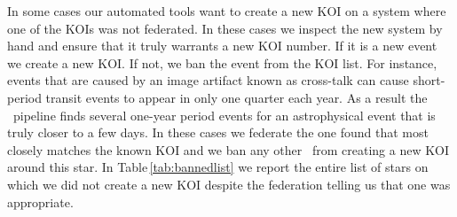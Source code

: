In some cases our automated tools want to create a new KOI on a system where one of the KOIs was not federated.  In these cases we inspect the new system by hand and ensure that it truly warrants a new KOI number. If it is a new event we create a new KOI. If not, we ban the event from the KOI list.  For instance, events that are caused by an image artifact known as cross-talk \citet{Coughlin2014a} can cause short-period transit events to appear in only one quarter each year. As a result the \Kepler\ pipeline finds several one-year period events for an astrophysical event that is truly closer to a few days.  In these cases we federate the one found that most closely matches the known KOI and we ban any other \opstce\ from creating a new KOI around this star. In Table\,\ref{tab:bannedlist} we report the entire list of stars on which we did not create a new KOI despite the federation telling us that one was appropriate.





